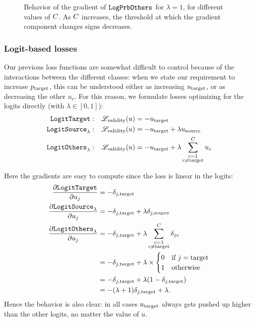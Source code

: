 \documentclass[../main.tex]{subfiles}
\begin{document}
\begin{figure}[htbp]
	\centering
    
	\caption{Behavior of the gradient of $\mathtt{LogPrbOthers}_{}$ for $\lambda = 1$, for different values of $C$. As $C$ increases, the threshold at which the gradient component changes signs decreases.}
	\label{fig:log_prb_others}
\end{figure}

\subsubsection{Logit-based losses}

Our previous loss functions are somewhat difficult to control because of the interactions between the different classes:
when we state our requirement to increase $p_{\mathrm{target}}$, this can be understood either as increasing $u_{\mathrm{target}}$, or as decreasing the other $u_c$.
For this reason, we formulate losses optimizing for the logits directly (with $\lambda \in [0, 1]$):
\begin{align*}
    \mathtt{LogitTarget}{}:        & \quad    \mathscr{L}_\text{validity}(u) = - u_{\mathrm{target}}                         \\
    \mathtt{LogitSource}_{\lambda}: & \quad     \mathscr{L}_\text{validity}(u) = - u_{\mathrm{target}} + \lambda u_{\mathrm{source}}    \\
    \mathtt{LogitOthers}_{\lambda}: & \quad    \mathscr{L}_\text{validity}(u) = - u_{\mathrm{target}} + \lambda \sum_{\substack{{c}=1 \\ {c} \neq \mathrm{target}}}^C u_c
\end{align*}

Here the gradients are easy to compute since the loss is linear in the logits:
\begin{align*}
\frac{\partial \mathtt{LogitTarget}{}}{\partial u_j} &= - \delta_{j, \mathrm{target}}                         \\
\frac{\partial \mathtt{LogitSource}_{\lambda}}{\partial u_j} &= - \delta_{j, \mathrm{target}} + \lambda \delta_{j, \mathrm{source}}                        \\
\frac{\partial \mathtt{LogitOthers}_{\lambda}}{\partial u_j}
&= - \delta_{j, \mathrm{target}} + \lambda \sum_{\substack{{c}=1 \\ {c} \neq \mathrm{target}}}^C \delta_{jc} \\
&= - \delta_{j, \mathrm{target}} + \lambda \times \begin{cases}
    0 & \text{if } j = \mathrm{target} \\
    1 & \text{otherwise} 
\end{cases} \\
&= - \delta_{j, \mathrm{target}} + \lambda (1 - \delta_{j, \mathrm{target}}) \\
&= -(\lambda + 1)\delta_{j, \mathrm{target}} + \lambda.
\end{align*}
Hence the behavior is also clear: in all cases $u_{\mathrm{target}}$ always gets pushed up higher than the other logits, no matter the value of $u$.
\end{document}
